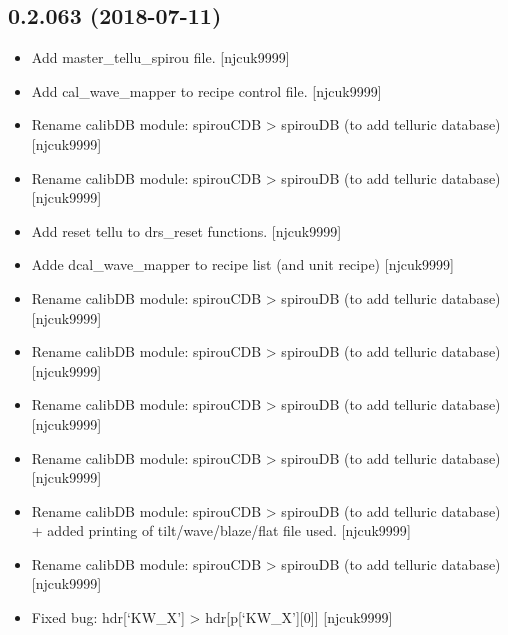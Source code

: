 \documentclass[a4paper,10pt,english]{report}
\begin{document}
\subsection{0.2.063 (2018-07-11)}
\label{\detokenize{misc/changelog:id395}}\begin{itemize}
\item {} 
Add master\_tellu\_spirou file. {[}njcuk9999{]}

\item {} 
Add cal\_wave\_mapper to recipe control file. {[}njcuk9999{]}

\item {} 
Rename calibDB module: spirouCDB \textendash{}\textgreater{} spirouDB (to add telluric
database) {[}njcuk9999{]}

\item {} 
Rename calibDB module: spirouCDB \textendash{}\textgreater{} spirouDB (to add telluric
database) {[}njcuk9999{]}

\item {} 
Add reset tellu to drs\_reset functions. {[}njcuk9999{]}

\item {} 
Adde dcal\_wave\_mapper to recipe list (and unit recipe) {[}njcuk9999{]}

\item {} 
Rename calibDB module: spirouCDB \textendash{}\textgreater{} spirouDB (to add telluric
database) {[}njcuk9999{]}

\item {} 
Rename calibDB module: spirouCDB \textendash{}\textgreater{} spirouDB (to add telluric
database) {[}njcuk9999{]}

\item {} 
Rename calibDB module: spirouCDB \textendash{}\textgreater{} spirouDB (to add telluric
database) {[}njcuk9999{]}

\item {} 
Rename calibDB module: spirouCDB \textendash{}\textgreater{} spirouDB (to add telluric
database) {[}njcuk9999{]}

\item {} 
Rename calibDB module: spirouCDB \textendash{}\textgreater{} spirouDB (to add telluric
database) + added printing of tilt/wave/blaze/flat file used.
{[}njcuk9999{]}

\item {} 
Rename calibDB module: spirouCDB \textendash{}\textgreater{} spirouDB (to add telluric
database) {[}njcuk9999{]}

\item {} 
Fixed bug: hdr{[}‘KW\_X’{]} \textendash{}\textgreater{} hdr{[}p{[}‘KW\_X’{]}{[}0{]}{]} {[}njcuk9999{]}


\end{itemize}
\end{document}
